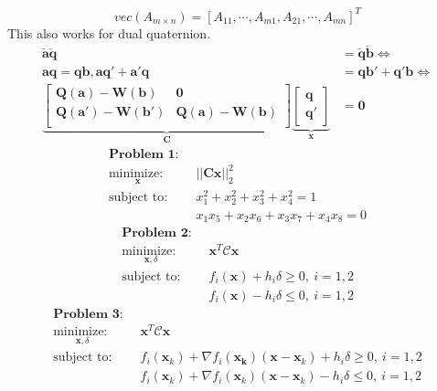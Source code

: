 \documentclass[a4paper]{report}
\begin{document}
$$
vec(A_{m\times n})=[A_{11}, \cdots, A_{m1}, A_{21}, \cdots, A_{mn}]^T
$$
This also works for dual quaternion.
\begin{align}
\check{\mathbf{a}}\check{\mathbf{q}}&=\check{\mathbf{q}}
\check{\mathbf{b}} \Leftrightarrow \\
\mathbf{a}\mathbf{q}=\mathbf{q}\mathbf{b}, \mathbf{a}\mathbf{q}'+\mathbf{a}'\mathbf{q}&=\mathbf{q}\mathbf{b}'+\mathbf{q}'\mathbf{b}  \Leftrightarrow \\
\underbrace{
\left[
\begin{matrix}
\mathbf{Q}(\mathbf{a})-\mathbf{W}(\mathbf{b}) & \mathbf{0} \\
\mathbf{Q}(\mathbf{a}')-\mathbf{W}(\mathbf{b}') & \mathbf{Q}(\mathbf{a})-\mathbf{W}(\mathbf{b}) \\
\end{matrix}
\right]}_{\mathbf{C}}
\underbrace{
\left[
\begin{matrix}
\mathbf{q} \\
\mathbf{q}'
\end{matrix}
\right]}_{\mathbf{x}}&=\mathbf{0}
\end{align}
\begin{align}
\textbf{Problem 1: } \nonumber \\
\underset{\mathbf{x}}{\text{minimize: }}& \ ||\mathbf{Cx}||_2^2 \\
{\text{subject to: }}& \ x_1^2+x_2^2+x_3^2+x_4^2=1 \\
& \ x_1x_5+x_2x_6+x_3x_7+x_4x_8=0
\end{align}
\begin{align}
\textbf{Problem 2: } \nonumber \\
\underset{\mathbf{x}, \delta}{\text{minimize: }}& \ \mathbf{x}^T\mathcal{C}\mathbf{x} \\
{\text{subject to: }}& \ f_i(\mathbf{x}) + h_i\delta \geq 0,\ i=1,2 \\
& \ f_i(\mathbf{x}) - h_i\delta \leq 0,\ i=1,2 
\end{align}
\begin{align}
\textbf{Problem 3: } \nonumber \\
\underset{\mathbf{x}, \delta}{\text{minimize: }}& \ \mathbf{x}^T\mathcal{C}\mathbf{x} \\
{\text{subject to: }}& \ f_i(\mathbf{x}_k) + \nabla f_i(\mathbf{x_k})(\mathbf{x}-\mathbf{x}_k) + h_i\delta \geq 0,\ i=1,2 \\
& \ f_i(\mathbf{x}_k) + \nabla f_i(\mathbf{x}_k)(\mathbf{x}-\mathbf{x}_k) - h_i\delta \leq 0,\ i=1,2 
\end{align}
\end{document}
